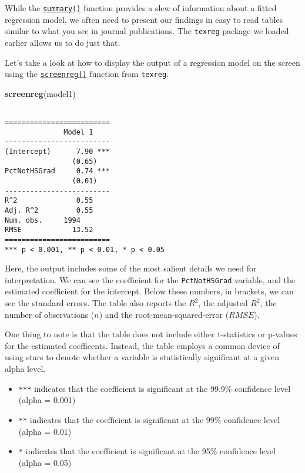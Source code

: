 \documentclass[]{article}
\newenvironment{Shaded}{\begin{snugshade}}{\end{snugshade}}
\newcommand{\KeywordTok}[1]{\textcolor[rgb]{0.13,0.29,0.53}{\textbf{#1}}}
\newcommand{\NormalTok}[1]{#1}
\providecommand{\tightlist}{%
  \setlength{\itemsep}{0pt}\setlength{\parskip}{0pt}}
\begin{document}
While the \href{http://bit.ly/R_summary}{\texttt{summary()}} function provides a slew of information about a fitted regression model, we often need to present our findings in easy to read tables similar to what you see in journal publications. The \texttt{texreg} package we loaded earlier allows us to do just that.

Let's take a look at how to display the output of a regression model on the screen using the \href{http://bit.ly/R_texreg}{\texttt{screenreg()}} function from \texttt{texreg}.

\begin{Shaded}
\begin{Highlighting}[]
\KeywordTok{screenreg}\NormalTok{(model1)}
\end{Highlighting}
\end{Shaded}

\begin{verbatim}

=========================
              Model 1    
-------------------------
(Intercept)      7.90 ***
                (0.65)   
PctNotHSGrad     0.74 ***
                (0.01)   
-------------------------
R^2              0.55    
Adj. R^2         0.55    
Num. obs.     1994       
RMSE            13.52    
=========================
*** p < 0.001, ** p < 0.01, * p < 0.05
\end{verbatim}

Here, the output includes some of the most salient details we need for interpretation. We can see the coefficient for the \texttt{PctNotHSGrad} variable, and the estimated coefficient for the intercept. Below these numbers, in brackets, we can see the standard errors. The table also reports the \(R^2\), the adjusted \(R^2\), the number of observations (\(n\)) and the root-mean-squared-error (\(RMSE\)).

One thing to note is that the table does not include either t-statistics or p-values for the estimated coefficents. Instead, the table employs a common device of using stars to denote whether a variable is statistically significant at a given alpha level.

\begin{itemize}
\tightlist
\item
  \texttt{***} indicates that the coefficient is significant at the 99.9\% confidence level (alpha = 0.001)
\item
  \texttt{**} indicates that the coefficient is significant at the 99\% confidence level (alpha = 0.01)
\item
  \texttt{*} indicates that the coefficient is significant at the 95\% confidence level (alpha = 0.05)
\end{itemize}
\end{document}
